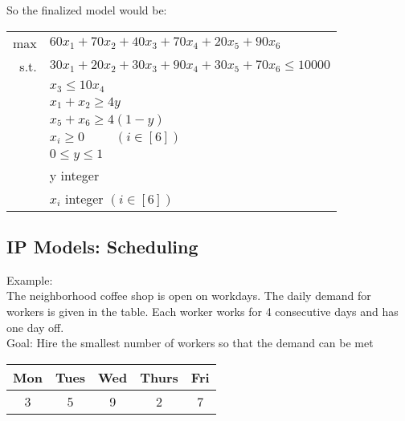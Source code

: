 \documentclass[letterpaper, 12pt]{article}
\begin{document}
    So the finalized model would be:\\
    \begin{center}
        \begin{tabular}{rl}
            max & $60x_1 + 70x_2 + 40x_3 + 70x_4 + 20x_5 + 90x_6$\\
            s.t. & $30x_1 + 20x_2 + 30x_3 + 90x_4 + 30x_5 + 70x_6 \leq 10000$\\
            & $ x_3 \leq 10x_4$\\
            & $x_1 + x_2 \geq 4y$\\
            & $x_5 + x_6 \geq 4(1 - y)$\\
            & $x_i \geq 0 \hspace{1cm} (i\in[6])$\\
            & $0 \leq y \leq 1$\\
            & y integer\\
            & $x_i$ integer $(i \in [6])$\\
        \end{tabular} 
    \end{center}
    \pagebreak
    \subsection{IP Models: Scheduling}
    Example:\\
    The neighborhood coffee shop is open on workdays. The daily demand for workers is given in the table.
    Each worker works for 4 consecutive days and has one day off.\\
    Goal: Hire the smallest number of workers so that the demand can be met\\
    \bigskip
    \begin{tabular}{|c|c|c|c|c|}
        \hline
        Mon & Tues & Wed & Thurs & Fri\\
        \hline
        3 & 5 & 9 & 2 & 7\\
        \hline
    \end{tabular}
    
\end{document}
